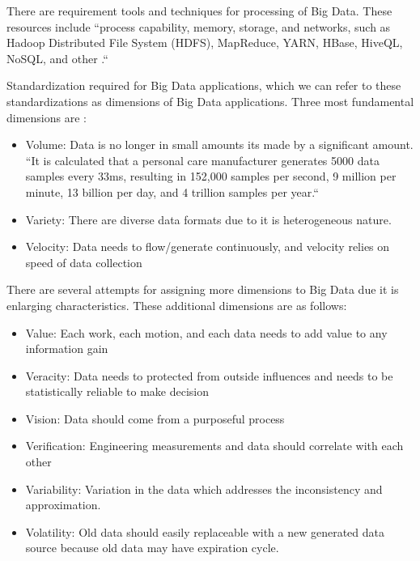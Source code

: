 \documentclass[sigconf]{acmart}
\begin{document}
\par There are requirement tools and techniques for processing of Big Data. These resources include ``process capability, memory, storage, and networks, such as Hadoop Distributed File System (HDFS), MapReduce, YARN, HBase, HiveQL, NoSQL, and other \cite{BABICEANU2016128}.``

\par Standardization required for Big Data applications, which we can refer to these standardizations as dimensions of Big Data applications. Three most fundamental dimensions are \cite{BABICEANU2016128, ZHONG2016572}:

\begin{itemize}
    \item Volume: Data is no longer in small amounts its made by a significant amount. ``It is calculated that a personal care manufacturer generates 5000 data samples every 33ms, resulting in 152,000 samples per second, 9 million per minute, 13 billion per day, and 4 trillion samples per year.``
    \item Variety: There are diverse data formats due to it is heterogeneous nature. 
    \item Velocity: Data needs to flow/generate continuously, and velocity relies on speed of data collection
\end{itemize}

\par There are several attempts for assigning more dimensions to Big Data due it is enlarging characteristics. These additional dimensions are as follows\cite{BABICEANU2016128}: 

\begin{itemize}
    \item Value: Each work, each motion, and each data needs to add value to any information gain
    \item Veracity: Data needs to protected from outside influences and needs to be statistically reliable to make decision
    \item Vision: Data should come from a purposeful process
    \item Verification: Engineering measurements and data should correlate with each other
    \item Variability: Variation in the data which addresses the inconsistency and approximation. 
    \item Volatility: Old data should easily replaceable with a new generated data source because old data may have expiration cycle.
    \end{itemize}
    
\end{document}
